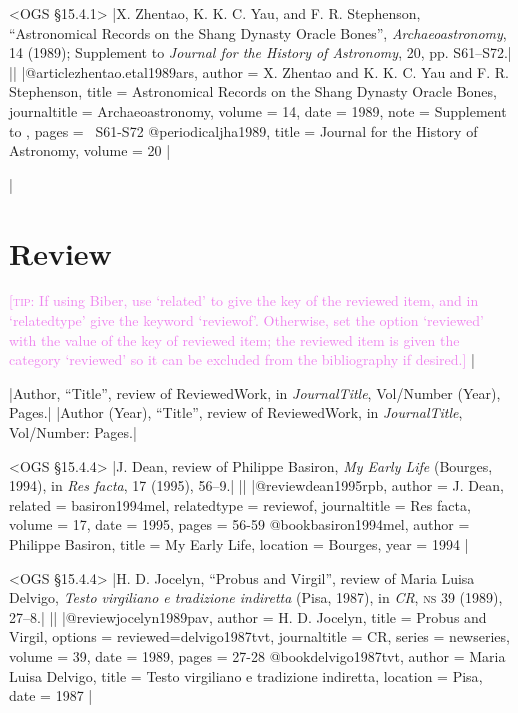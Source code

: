 \documentclass[extrafontsizes,11pt,a4paper,oneside]{memoir}
\newcommand*{\lit}[1]{\textsf{#1}}
\newcommand*{\code}[1]{`\textsf{#1}'}
\newcommand*{\aside}[1]{\textcolor{violet}{[\textsc{tip:} #1]}}
\begin{document}
\bibexample<OGS \S15.4.1>
|X. Zhentao, K. K. C. Yau, and F. R. Stephenson, \enquote{Astronomical Records on the Shang Dynasty Oracle Bones}, \emph{Archaeoastronomy}, 14 (1989); Supplement to \emph{Journal for the History of Astronomy}, 20, pp. S61--S72.|%
||%
|@article{zhentao.etal1989ars,
  author = {X. Zhentao and K. K. C. Yau and F. R. Stephenson},
  title = {Astronomical Records on the Shang Dynasty Oracle Bones},
  journaltitle = {Archaeoastronomy},
  volume = {14},
  date = {1989},
  note = {Supplement to },
  pages = {\ppno~S61-S72}
}
@periodical{jha1989,
  title = {Journal for the History of Astronomy},
  volume = {20}
}|
  
\todoc|
\section{Review}

\aside{If using Biber, use \code{related} to give the key of the reviewed item, and in \code{relatedtype} give the keyword \code{reviewof}. Otherwise, set the option \code{reviewed} with the value of the key of reviewed item; the reviewed item is given the category \code{reviewed} so it can be excluded from the bibliography if desired.}
|

\specs
|Author, \enquote{Title}, \lit{review of} ReviewedWork, \lit{in} \emph{JournalTitle}, Vol/Number (Year), Pages.|%
|Author (Year), \enquote{Title}, \lit{review of} ReviewedWork, \lit{in} \emph{JournalTitle}, Vol/Number: Pages.|

\bibexample<OGS \S15.4.4>
|J. Dean, review of Philippe Basiron, \emph{My Early Life} (Bourges, 1994), in \emph{Res facta}, 17 (1995), 56--9.|%
||%
|@review{dean1995rpb,
  author = {J. Dean},
  related = {basiron1994mel},
  relatedtype = {reviewof},
  journaltitle = {Res facta},
  volume = {17},
  date = {1995},
  pages = {56-59}
}
@book{basiron1994mel,
  author = {Philippe Basiron},
  title = {My Early Life},
  location = {Bourges},
  year = {1994}
}|

\bibexample<OGS \S15.4.4>
|H. D. Jocelyn, \enquote{Probus and Virgil}, review of Maria Luisa Delvigo, \emph{Testo virgiliano e tradizione indiretta} (Pisa, 1987), in \emph{CR}, \textsc{ns} 39 (1989), 27--8.|%
||%
|@review{jocelyn1989pav,
  author = {H. D. Jocelyn},
  title = {Probus and Virgil},
  options = {reviewed=delvigo1987tvt},
  journaltitle = {CR},
  series = {newseries},
  volume = {39},
  date = {1989},
  pages = {27-28}
}
@book{delvigo1987tvt,
  author = {Maria Luisa Delvigo},
  title = {Testo virgiliano e tradizione indiretta},
  location = {Pisa},
  date = {1987}
}|
\end{document}
